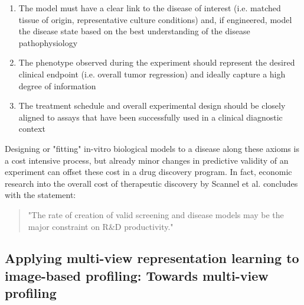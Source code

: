 \begin{flushleft}
\begin{enumerate}
    \item The model must have a clear link to the disease of interest (i.e. matched tissue of origin, representative culture conditions) and, if engineered, model the disease state based on the best understanding of the disease pathophysiology
    \item The phenotype observed during the experiment should represent the desired clinical endpoint (i.e. overall tumor regression) and ideally capture a high degree of information
    \item The treatment schedule and overall experimental design should be closely aligned to assays that have been successfully used in a clinical diagnostic context
\end{enumerate}

Designing or "fitting" in-vitro biological models to a disease along these axioms is a cost intensive process, but already minor changes in predictive validity of an experiment can offset these cost in a drug discovery program. In fact, economic research into the overall cost of therapeutic discovery by Scannel et al. \cite{scannellWhenQualityBeats2016} concludes with the statement:

\begin{quote}
"The rate of creation of valid screening and disease models may be the major constraint on R\&D productivity."
\end{quote}

\subsection{Applying multi-view representation learning to image-based profiling: Towards multi-view profiling}


\end{flushleft}
